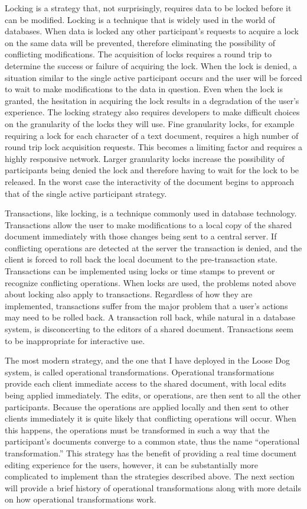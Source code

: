\documentclass{article}
\begin{document}
Locking is a strategy that, not surprisingly, requires data to be locked
before it can be modified.  Locking is a technique that is widely used
in the world of databases.  When data is locked any other
participant's requests to acquire a lock on the same data will be
prevented, therefore eliminating the possibility of conflicting
modifications.  The acquisition of locks requires a round trip to
determine the success or failure of acquiring the lock.  When the lock
is denied, a situation similar to the single active participant occurs
and the user will be forced to wait to make modifications to the data
in question.  Even when the lock is granted, the hesitation in
acquiring the lock results in a degradation of the user's experience.
The locking strategy also requires developers to make difficult
choices on the granularity of the locks they will use.  Fine
granularity locks, for example requiring a lock for each character of
a text document, requires a high number of round trip lock acquisition
requests.  This becomes a limiting factor and requires a highly responsive
network.  Larger granularity locks increase the possibility of
participants being denied the lock and therefore having to wait for
the lock to be released.  In the worst case the
interactivity of the document begins to approach that of the single
active participant strategy.

Transactions, like locking, is a technique commonly used in database
technology.  Transactions allow the user to make modifications to a
local copy of the shared document immediately with those changes being
sent to a central server.  If conflicting operations are detected at
the server the transaction is denied, and the client is forced to roll
back the local document to the pre-transaction state.  Transactions
can be implemented using locks or time stamps to prevent or recognize
conflicting operations.  When locks are used, the problems noted above
about locking also apply to transactions.  Regardless of how they are
implemented, transactions suffer from the major problem that a user's
actions may need to be rolled back.  A transaction roll back, while
natural in a database system, is disconcerting to the editors of a
shared document.  Transactions seem to be inappropriate for
interactive use.

The most modern strategy, and the one that I have deployed in the
Loose Dog system, is called operational transformations.
Operational transformations provide each client immediate access to the
shared document, with local edits being applied immediately.  The
edits, or operations, are then sent to all the other participants.
Because the operations are applied locally and then sent to other
clients immediately it is quite likely that conflicting operations will
occur.  When this happens, the operations must be transformed in such
a way that the participant's documents converge to a common state,
thus the name ``operational transformation.''  This strategy has the
benefit of providing a real time document editing experience for the
users, however, it can be substantially more complicated to
implement than the strategies described above.  The next section
will provide a brief history of operational transformations along with
more details on how operational transformations work.
\end{document}
